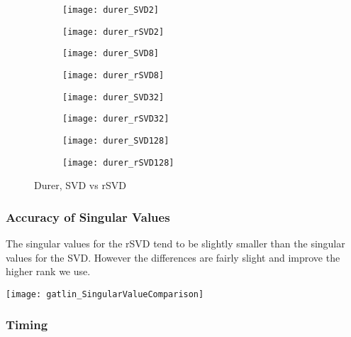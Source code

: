 \documentclass{article}
\begin{document}
\begin{figure}[h!]

\begin{subfigure}{.5\textwidth}
  \centering
  \texttt{[image: durer\_SVD2]}
\end{subfigure}%
\begin{subfigure}{.5\textwidth}
  \centering
  \texttt{[image: durer\_rSVD2]}
\end{subfigure}

\begin{subfigure}{.5\textwidth}
  \centering
  \texttt{[image: durer\_SVD8]}
\end{subfigure}
\begin{subfigure}{.5\textwidth}
  \centering
  \texttt{[image: durer\_rSVD8]}
\end{subfigure}

\begin{subfigure}{.5\textwidth}
  \centering
  \texttt{[image: durer\_SVD32]}
\end{subfigure}
\begin{subfigure}{.5\textwidth}
  \centering
  \texttt{[image: durer\_rSVD32]}
\end{subfigure}

\begin{subfigure}{.5\textwidth}
  \centering
  \texttt{[image: durer\_SVD128]}
\end{subfigure}
\begin{subfigure}{.5\textwidth}
  \centering
  \texttt{[image: durer\_rSVD128]}
\end{subfigure}


\caption{Durer, SVD vs rSVD}
\end{figure}

\cleardoublepage

\subsubsection{Accuracy of Singular Values}

The singular values for the rSVD tend to be slightly smaller than the singular values for the SVD. However the differences are fairly slight and improve the higher rank we use.

\texttt{[image: gatlin\_SingularValueComparison]}

\subsubsection{Timing}
\end{document}
